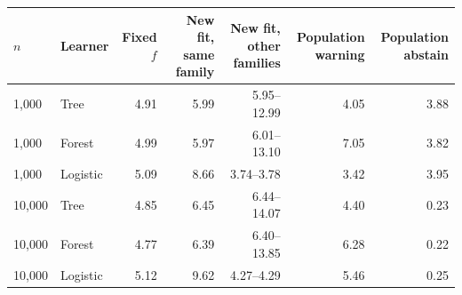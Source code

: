 \begin{tabular}{llrrrrr}
\toprule
$n$ & Learner & Fixed $f$ & New fit, same family & New fit, other families & Population warning & Population abstain \\
\midrule
1,000 & Tree & 4.91 & 5.99 & 5.95--12.99 & 4.05 & 3.88 \\
1,000 & Forest & 4.99 & 5.97 & 6.01--13.10 & 7.05 & 3.82 \\
1,000 & Logistic & 5.09 & 8.66 & 3.74--3.78 & 3.42 & 3.95 \\
10,000 & Tree & 4.85 & 6.45 & 6.44--14.07 & 4.40 & 0.23 \\
10,000 & Forest & 4.77 & 6.39 & 6.40--13.85 & 6.28 & 0.22 \\
10,000 & Logistic & 5.12 & 9.62 & 4.27--4.29 & 5.46 & 0.25 \\
\bottomrule
\end{tabular}

